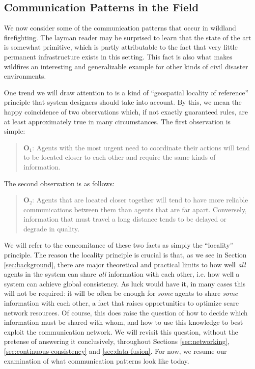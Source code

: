 \documentclass[]             %
{NASA}                       %
\theoremstyle{definition}
\begin{document}

\subsection{Communication Patterns in the Field}
\label{communication-in-practice}

We now consider some of the communication patterns that occur in
wildland firefighting. The layman reader may be surprised to learn
that the state of the art is somewhat primitive, which is partly
attributable to the fact that very little permanent infrastructure
exists in this setting. This fact is also what makes wildfires an
interesting and generalizable example for other kinds of civil
disaster environments.

One trend we will draw attention to is a kind of ``geospatial locality
of reference'' principle that system designers should take into
account. By this, we mean the happy coincidence of two observations
which, if not exactly guaranteed rules, are at least approximately
true in many circumstances. The first observation is simple:
\begin{quote}
  $\textbf{O}_1$: Agents with the most urgent need to
  coordinate their actions will tend to be located closer to each
  other and require the same kinds of information.
\end{quote}
The second observation is as follows:
\begin{quote}
  $\textbf{O}_2$: Agents that are located closer together
  will tend to have more reliable communications between them than
  agents that are far apart. Conversely, information that must travel
  a long distance tends to be delayed or degrade in quality.
\end{quote}

We will refer to the concomitance of these two facts as simply the
``locality'' principle. The reason the locality principle is crucial
is that, as we see in Section \ref{sec:background}, there are major
theoretical and practical limits to how well \emph{all} agents in the
system can share \emph{all} information with each other, i.e. how well
a system can achieve global consistency. As luck would have it, in
many cases this will not be required: it will be often be enough for
\emph{some} agents to share \emph{some} information with each other, a
fact that raises opportunities to optimize scare network resources. Of
course, this does raise the question of how to decide which
information must be shared with whom, and how to use this knowledge to
best exploit the communication network. We will revisit this question,
without the pretense of answering it conclusively, throughout Sections
\ref{sec:networking}, \ref{sec:continuous-consistency} and
\ref{sec:data-fusion}. For now, we resume our examination of what
communication patterns look like today.
\end{document}
